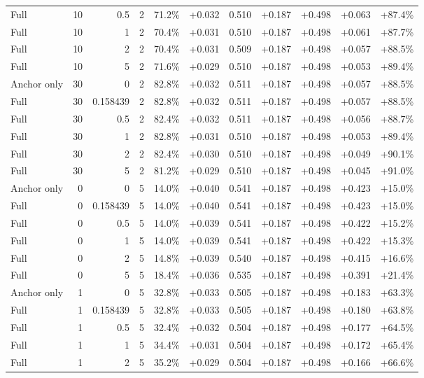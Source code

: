 \begin{table}[htbp]
\begin{tabular}{lrrrccccccc}
Full & 10 & 0.5 & 2 & 71.2\% & +0.032 & 0.510 & +0.187 & +0.498 & +0.063 & +87.4\% \\
Full & 10 & 1 & 2 & 70.4\% & +0.031 & 0.510 & +0.187 & +0.498 & +0.061 & +87.7\% \\
Full & 10 & 2 & 2 & 70.4\% & +0.031 & 0.509 & +0.187 & +0.498 & +0.057 & +88.5\% \\
Full & 10 & 5 & 2 & 71.6\% & +0.029 & 0.510 & +0.187 & +0.498 & +0.053 & +89.4\% \\
Anchor only & 30 & 0 & 2 & 82.8\% & +0.032 & 0.511 & +0.187 & +0.498 & +0.057 & +88.5\% \\
Full & 30 & 0.158439 & 2 & 82.8\% & +0.032 & 0.511 & +0.187 & +0.498 & +0.057 & +88.5\% \\
Full & 30 & 0.5 & 2 & 82.4\% & +0.032 & 0.511 & +0.187 & +0.498 & +0.056 & +88.7\% \\
Full & 30 & 1 & 2 & 82.8\% & +0.031 & 0.510 & +0.187 & +0.498 & +0.053 & +89.4\% \\
Full & 30 & 2 & 2 & 82.4\% & +0.030 & 0.510 & +0.187 & +0.498 & +0.049 & +90.1\% \\
Full & 30 & 5 & 2 & 81.2\% & +0.029 & 0.510 & +0.187 & +0.498 & +0.045 & +91.0\% \\
Anchor only & 0 & 0 & 5 & 14.0\% & +0.040 & 0.541 & +0.187 & +0.498 & +0.423 & +15.0\% \\
Full & 0 & 0.158439 & 5 & 14.0\% & +0.040 & 0.541 & +0.187 & +0.498 & +0.423 & +15.0\% \\
Full & 0 & 0.5 & 5 & 14.0\% & +0.039 & 0.541 & +0.187 & +0.498 & +0.422 & +15.2\% \\
Full & 0 & 1 & 5 & 14.0\% & +0.039 & 0.541 & +0.187 & +0.498 & +0.422 & +15.3\% \\
Full & 0 & 2 & 5 & 14.8\% & +0.039 & 0.540 & +0.187 & +0.498 & +0.415 & +16.6\% \\
Full & 0 & 5 & 5 & 18.4\% & +0.036 & 0.535 & +0.187 & +0.498 & +0.391 & +21.4\% \\
Anchor only & 1 & 0 & 5 & 32.8\% & +0.033 & 0.505 & +0.187 & +0.498 & +0.183 & +63.3\% \\
Full & 1 & 0.158439 & 5 & 32.8\% & +0.033 & 0.505 & +0.187 & +0.498 & +0.180 & +63.8\% \\
Full & 1 & 0.5 & 5 & 32.4\% & +0.032 & 0.504 & +0.187 & +0.498 & +0.177 & +64.5\% \\
Full & 1 & 1 & 5 & 34.4\% & +0.031 & 0.504 & +0.187 & +0.498 & +0.172 & +65.4\% \\
Full & 1 & 2 & 5 & 35.2\% & +0.029 & 0.504 & +0.187 & +0.498 & +0.166 & +66.6\% \\

\end{tabular}
\end{table}
